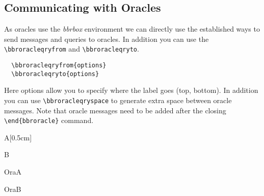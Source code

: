 \documentclass[a4paper]{report}
\begin{document}
  
  \subsection{Communicating with Oracles}
  As oracles use the \emph{bbrbox} environment we can directly use the established ways to send messages and
  queries to oracles. In addition you can use the \lstinline$\bbroracleqryfrom$ and \lstinline$\bbroracleqryto$.
  \begin{lstlisting}
  \bbroracleqryfrom{options}
  \bbroracleqryto{options}
  \end{lstlisting}
  Here options allow you to specify where the label goes (top, bottom). In addition you can use
  \lstinline$\bbroracleqryspace$ to generate extra space between oracle messages. Note
  that oracle messages need to be added after the closing \lstinline$\end{bbroracle}$ command.
  
  \begin{bbrenv}[1cm]{A}[0.5cm]
	  \begin{bbrbox}[name=Reduction]
  
	  \begin{bbrenv}{B}
		  \begin{bbrbox}[name=Adversary,minheight=3cm,xshift=3cm]
		  \end{bbrbox}
  
	  \end{bbrenv}
  
	  \end{bbrbox}
  
	  \begin{bbroracle}{OraA}
		  \begin{bbrbox}[name=Oracle 1,minheight=1cm]
		  \end{bbrbox}
	  \end{bbroracle}
  
	  \begin{bbroracle}{OraB}
		  \begin{bbrbox}[name=Oracle 2,minheight=1cm]
		  \end{bbrbox}
	  \end{bbroracle}
  \end{bbrenv}
  
\end{document}
